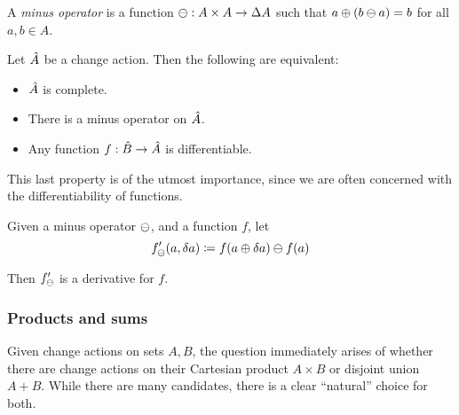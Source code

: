 \begin{defn}
  A \emph{minus operator} is a function $\ominus: A \times A \rightarrow
  \Delta A$ such that $a \oplus (b \ominus a) = b$ for all $a, b \in A$.
\end{defn}

\begin{prop}
  Let $\hat{A}$ be a change action. Then the following are equivalent:
  \begin{itemize}
    \item $\hat{A}$ is complete.
    \item There is a minus operator on $\hat{A}$.
    \item Any function $f: \hat{B} \rightarrow \hat{A}$ is differentiable.
  \end{itemize}
\end{prop}

This last property is of the utmost importance, since we are often concerned with the differentiability
of functions.

\begin{prop}
  \label{prop:minusDerivatives}
  Given a minus operator $\ominus$, and a function $f$, let
  \begin{displaymath}
    f'_\ominus(a, \delta a) \coloneqq f(a \oplus \delta a) \ominus f(a)
  \end{displaymath}

  Then $f'_\ominus$ is a derivative for $f$.
\end{prop}

\subsubsection{Products and sums}

Given change actions on sets $A, B$, the question immediately arises of whether there are
change actions on their Cartesian product $A \times B$ or disjoint union $A + B$. While there are
many candidates, there is a clear ``natural'' choice for both.

